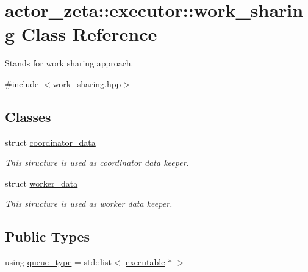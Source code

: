 \hypertarget{classactor__zeta_1_1executor_1_1work__sharing}{}\section{actor\+\_\+zeta\+:\+:executor\+:\+:work\+\_\+sharing Class Reference}
\label{classactor__zeta_1_1executor_1_1work__sharing}


Stands for work sharing approach.  




{\ttfamily \#include $<$work\+\_\+sharing.\+hpp$>$}

\subsection*{Classes}
\begin{DoxyCompactItemize}
\item 
struct \hyperlink{structactor__zeta_1_1executor_1_1work__sharing_1_1coordinator__data}{coordinator\+\_\+data}
\begin{DoxyCompactList}\small\item\em This structure is used as coordinator data keeper. \end{DoxyCompactList}\item 
struct \hyperlink{structactor__zeta_1_1executor_1_1work__sharing_1_1worker__data}{worker\+\_\+data}
\begin{DoxyCompactList}\small\item\em This structure is used as worker data keeper. \end{DoxyCompactList}\end{DoxyCompactItemize}
\subsection*{Public Types}
\begin{DoxyCompactItemize}
\item 
using \hyperlink{classactor__zeta_1_1executor_1_1work__sharing_a4ed160584612bb4abf7e23ace3590801}{queue\+\_\+type} = std\+::list$<$ \hyperlink{structactor__zeta_1_1executor_1_1executable}{executable} $\ast$ $>$
\end{DoxyCompactItemize}
